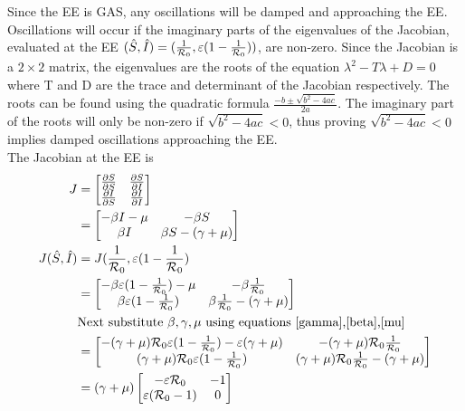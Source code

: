 Since the EE is GAS, any oscillations will be damped and approaching the EE.
Oscillations will occur if the imaginary parts of the eigenvalues of the Jacobian, evaluated at the EE $(\hat{S},\hat{I}) = (\frac{1}{\mathcal R_0},\varepsilon(1-\frac{1}{\mathcal R_0}))$, are non-zero.
Since the Jacobian is a $2\times 2$ matrix, the eigenvalues are the roots of the equation $\lambda^2 - T\lambda + D = 0$ where T and D are the trace and determinant of the Jacobian respectively.
The roots can be found using the quadratic formula $\frac{-b \pm \sqrt{b^2-4ac}}{2a}$.
The imaginary part of the roots will only be non-zero if $\sqrt{b^2-4ac} < 0$, thus proving $\sqrt{b^2-4ac} < 0$ implies damped oscillations approaching the EE.\\
The Jacobian at the EE is
\begin{align}
J &=
\begin{bmatrix}
    \frac{\partial S}{\partial S} & \frac{\partial S}{\partial I}\\
    \frac{\partial I}{\partial S} & \frac{\partial I}{\partial I}
\end{bmatrix}\\
&=
\begin{bmatrix}
    -\beta I - \mu & -\beta S\\
    \beta I &\beta S - (\gamma+\mu)
\end{bmatrix}\\
J(\hat{S},\hat{I}) &= J(\frac{1}{\mathcal R_0},\varepsilon(1-\frac{1}{\mathcal R_0})\\
&=
\begin{bmatrix}
    -\beta \varepsilon(1-\frac{1}{\mathcal R_0}) - \mu & -\beta \frac{1}{\mathcal R_0}\\
    \beta \varepsilon(1-\frac{1}{\mathcal R_0}) &\beta \frac{1}{\mathcal R_0} - (\gamma+\mu)
\end{bmatrix}\\
& \textrm{Next substitute $\beta, \gamma, \mu$ using equations \ref{gamma},\ref{beta},\ref{mu}}\nonumber\\
&=
\begin{bmatrix}
    -(\gamma+\mu){\mathcal R_0} \varepsilon(1-\frac{1}{\mathcal R_0}) - \varepsilon(\gamma+\mu) & -(\gamma+\mu){\mathcal R_0} \frac{1}{\mathcal R_0}\\
    (\gamma+\mu){\mathcal R_0} \varepsilon(1-\frac{1}{\mathcal R_0}) &(\gamma+\mu){\mathcal R_0} \frac{1}{\mathcal R_0} - (\gamma+\mu)
\end{bmatrix}\\
&= (\gamma+\mu)
\begin{bmatrix}
    -\varepsilon {\mathcal R_0}  & -1\\
    \varepsilon({\mathcal R_0}-1) & 0
\end{bmatrix}
\end{align}
